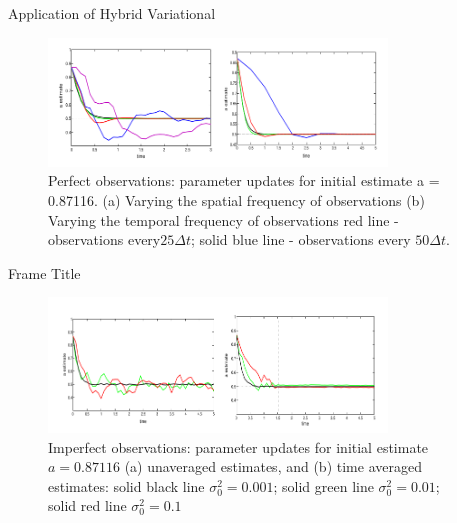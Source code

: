 \documentclass{beamer}
\begin{document}
\begin{frame}{Application of Hybrid Variational}
\begin{figure}[h]
    \begin{center}
    \includegraphics[width=9cm]{../Image/perfectObsAdvection.png}
    \caption{Perfect observations: parameter updates for initial estimate a = 0.87116.
(a) Varying the spatial frequency of observations (b) Varying the temporal frequency
of observations
red line - observations every$25\Delta t$; solid blue line - observations every $50\Delta t$.}
    \label{perfectObs}
    \end{center}
\end{figure}
\end{frame}

\begin{frame}{Frame Title}
\begin{figure}[h]
    \begin{center}
    \includegraphics[width=9cm]{../Image/noisyObs.png}
    \caption{Imperfect observations: parameter updates for initial estimate $a = 0.87116$ (a) unaveraged estimates, and (b) time averaged estimates: solid black line $\sigma_0^2 = 0.001$; solid green line $\sigma_0^2 = 0.01$; solid red line $\sigma_0^2= 0.1$}
    \label{noisyObs}
    \end{center}
\end{figure}
\end{frame}
\end{document}
